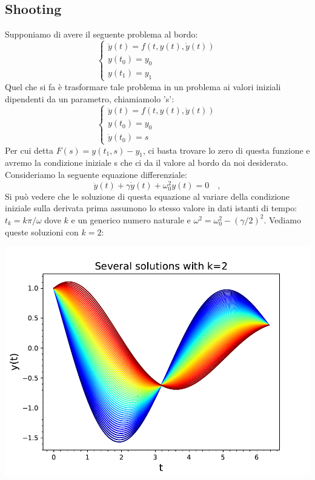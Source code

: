 \documentclass[10pt,a4paper]{article}
\begin{document}
\subsection{Shooting}
Supponiamo di avere il seguente problema al bordo:
\begin{equation}
\begin{cases}
\ddot{y}(t) = f(t, y(t), \dot{y}(t))\\
y(t_0)=y_0\\
y(t_1)=y_1
\end{cases}
\end{equation}
Quel che si fa è trasformare tale problema in un problema ai valori iniziali dipendenti da un parametro, chiamiamolo 's':
\begin{equation}
\begin{cases}
\ddot{y}(t)=f(t, y(t), \dot{y}(t))\\ 
y(t_0)=y_0\\
\dot{y}(t_0)=s
\end{cases}
\end{equation}
Per cui detta $F(s)=y(t_1, s) - y_1$, ci basta trovare lo zero di questa funzione e avremo la condizione iniziale s che ci da il valore al bordo da noi desiderato. Consideriamo la seguente equazione differenziale:
\begin{equation}
\ddot{y}(t) + \gamma \dot{y}(t) + \omega_0^2 y(t) = 0 \quad,
\end{equation}
Si può vedere che le soluzione di questa equazione al variare della condizione iniziale sulla derivata prima assumono lo stesso valore in dati istanti di tempo: $t_k = k \pi/ \omega$ dove $k$ e un generico numero naturale e $\omega^2= \omega_0^2 - (\gamma/2)^2$. Vediamo queste soluzioni con $k=2$:

\begin{center}
\includegraphics[scale=0.75]{img/BVP_cfr.pdf}
\end{center}
\end{document}
